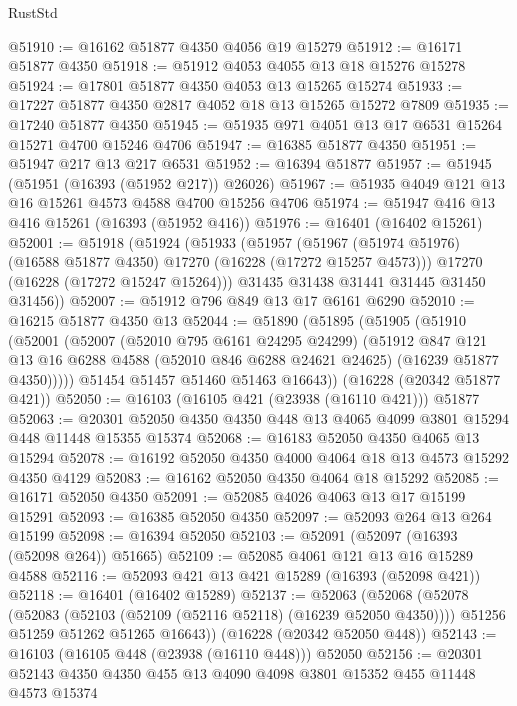 \begin{lexlean}{RustStd}
\begin{coremodule}
@51910 := @16162 @51877 @4350 @4056 @19 @15279
@51912 := @16171 @51877 @4350
@51918 := @51912 @4053 @4055 @13 @18 @15276 @15278
@51924 := @17801 @51877 @4350 @4053 @13 @15265 @15274
@51933 := @17227 @51877 @4350 @2817 @4052 @18 @13 @15265 @15272 @7809
@51935 := @17240 @51877 @4350
@51945 := @51935 @971 @4051 @13 @17 @6531 @15264 @15271 @4700 @15246 @4706
@51947 := @16385 @51877 @4350
@51951 := @51947 @217 @13 @217 @6531
@51952 := @16394 @51877
@51957 := @51945 (@51951 (@16393 (@51952 @217)) @26026)
@51967 := @51935 @4049 @121 @13 @16 @15261 @4573 @4588 @4700 @15256 @4706
@51974 := @51947 @416 @13 @416 @15261 (@16393 (@51952 @416))
@51976 := @16401 (@16402 @15261)
@52001 := @51918
    (@51924
      (@51933
        (@51957
          (@51967 (@51974 @51976) (@16588 @51877 @4350) @17270 (@16228 (@17272 @15257 @4573)))
          @17270
          (@16228 (@17272 @15247 @15264)))
        @31435
        @31438
        @31441
        @31445
        @31450
        @31456))
@52007 := @51912 @796 @849 @13 @17 @6161 @6290
@52010 := @16215 @51877 @4350 @13
@52044 := @51890
    (@51895
      (@51905
        (@51910
          (@52001
            (@52007
              (@52010 @795 @6161 @24295 @24299)
              (@51912
                @847
                @121
                @13
                @16
                @6288
                @4588
                (@52010 @846 @6288 @24621 @24625)
                (@16239 @51877 @4350)))))
        @51454
        @51457
        @51460
        @51463
        @16643))
    (@16228 (@20342 @51877 @421))
@52050 := @16103 (@16105 @421 (@23938 (@16110 @421))) @51877
@52063 := @20301 @52050 @4350 @4350 @448 @13 @4065 @4099 @3801 @15294 @448 @11448 @15355 @15374
@52068 := @16183 @52050 @4350 @4065 @13 @15294
@52078 := @16192 @52050 @4350 @4000 @4064 @18 @13 @4573 @15292 @4350 @4129
@52083 := @16162 @52050 @4350 @4064 @18 @15292
@52085 := @16171 @52050 @4350
@52091 := @52085 @4026 @4063 @13 @17 @15199 @15291
@52093 := @16385 @52050 @4350
@52097 := @52093 @264 @13 @264 @15199
@52098 := @16394 @52050
@52103 := @52091 (@52097 (@16393 (@52098 @264)) @51665)
@52109 := @52085 @4061 @121 @13 @16 @15289 @4588
@52116 := @52093 @421 @13 @421 @15289 (@16393 (@52098 @421))
@52118 := @16401 (@16402 @15289)
@52137 := @52063
    (@52068
      (@52078
        (@52083 (@52103 (@52109 (@52116 @52118) (@16239 @52050 @4350))))
        @51256
        @51259
        @51262
        @51265
        @16643))
    (@16228 (@20342 @52050 @448))
@52143 := @16103 (@16105 @448 (@23938 (@16110 @448))) @52050
@52156 := @20301 @52143 @4350 @4350 @455 @13 @4090 @4098 @3801 @15352 @455 @11448 @4573 @15374

\end{coremodule}
\end{lexlean}
